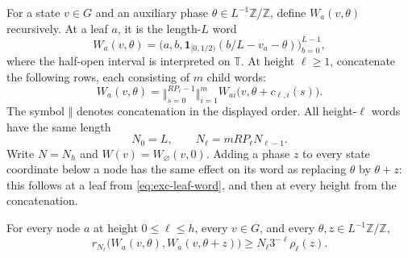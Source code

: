 For a state $v\in G$ and an auxiliary phase
$\theta\in L^{-1}\mathbb Z/\mathbb Z$, define $W_a(v,\theta)$ recursively.
At a leaf $a$, it is the length-$L$ word
\begin{equation}\label{eq:exc-leaf-word}
 W_a(v,\theta)=
 \bigl(a,b,\mathbf1_{[0,1/2)}(b/L-v_a-\theta)\bigr)_{b=0}^{L-1},
\end{equation}
where the half-open interval is interpreted on $\mathbb T$.  At height
$\ell\ge1$, concatenate the following rows, each consisting of $m$ child
words:
\begin{equation}\label{eq:exc-internal-word}
 W_a(v,\theta)=
 \mathop{\Vert}_{s=0}^{RP_\ell-1}
 \mathop{\Vert}_{i=1}^{m}
 W_{ai}\bigl(v,\theta+c_{\ell,i}(s)\bigr).
\end{equation}
The symbol $\Vert$ denotes concatenation in the displayed order.  All
height-$\ell$ words have the same length
\begin{equation}\label{eq:exc-length-recurrence}
 N_0=L,\qquad N_\ell=mRP_\ell N_{\ell-1}.
\end{equation}
Write $N=N_h$ and $W(v)=W_{\varnothing}(v,0)$.  Adding a phase $z$ to
every state coordinate below a node has the same effect on its word as
replacing $\theta$ by $\theta+z$: this follows at a leaf from
\eqref{eq:exc-leaf-word}, and then at every height from the concatenation.

\begin{lemma}\label{lem:exc-alignment}
For every node $a$ at height $0\le\ell\le h$, every $v\in G$, and every
$\theta,z\in L^{-1}\mathbb Z/\mathbb Z$,
\begin{equation}\label{eq:exc-word-separation}
 r_{N_\ell}\bigl(W_a(v,\theta),W_a(v,\theta+z)\bigr)
 \ge N_\ell 3^{-\ell}\rho_\ell(z).
\end{equation}
\end{lemma}

